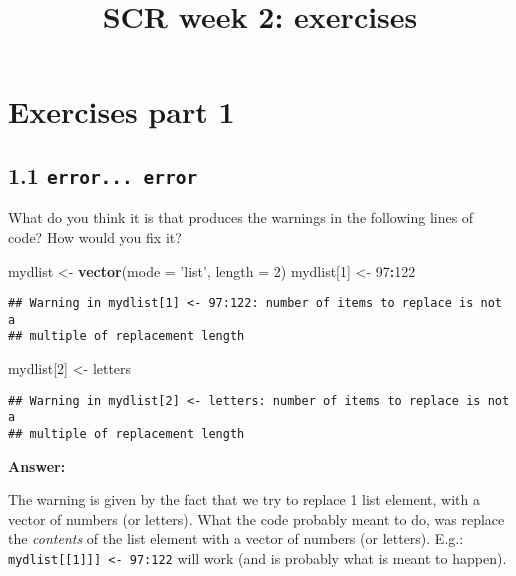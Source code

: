 \documentclass[]{article}
\title{SCR week 2: exercises}
\author{}
\date{}
\newenvironment{Shaded}{\begin{snugshade}}{\end{snugshade}}
\newcommand{\DataTypeTok}[1]{\textcolor[rgb]{0.13,0.29,0.53}{#1}}
\newcommand{\DecValTok}[1]{\textcolor[rgb]{0.00,0.00,0.81}{#1}}
\newcommand{\KeywordTok}[1]{\textcolor[rgb]{0.13,0.29,0.53}{\textbf{#1}}}
\newcommand{\NormalTok}[1]{#1}
\newcommand{\OperatorTok}[1]{\textcolor[rgb]{0.81,0.36,0.00}{\textbf{#1}}}
\newcommand{\StringTok}[1]{\textcolor[rgb]{0.31,0.60,0.02}{#1}}
\begin{document}
\maketitle

\hypertarget{exercises-part-1}{%
\section{Exercises part 1}\label{exercises-part-1}}

\hypertarget{error...-error}{%
\subsection{\texorpdfstring{1.1
\texttt{error...\ error}}{1.1 error... error}}\label{error...-error}}

What do you think it is that produces the warnings in the following
lines of code? How would you fix it?

\begin{Shaded}
\begin{Highlighting}[]
\NormalTok{mydlist <-}\StringTok{ }\KeywordTok{vector}\NormalTok{(}\DataTypeTok{mode =} \StringTok{'list'}\NormalTok{, }\DataTypeTok{length =} \DecValTok{2}\NormalTok{)}
\NormalTok{mydlist[}\DecValTok{1}\NormalTok{] <-}\StringTok{ }\DecValTok{97}\OperatorTok{:}\DecValTok{122}
\end{Highlighting}
\end{Shaded}

\begin{verbatim}
## Warning in mydlist[1] <- 97:122: number of items to replace is not a
## multiple of replacement length
\end{verbatim}

\begin{Shaded}
\begin{Highlighting}[]
\NormalTok{mydlist[}\DecValTok{2}\NormalTok{] <-}\StringTok{ }\NormalTok{letters}
\end{Highlighting}
\end{Shaded}

\begin{verbatim}
## Warning in mydlist[2] <- letters: number of items to replace is not a
## multiple of replacement length
\end{verbatim}

\textbf{Answer:}

The warning is given by the fact that we try to replace 1 list element,
with a vector of numbers (or letters). What the code probably meant to
do, was replace the \emph{contents} of the list element with a vector of
numbers (or letters). E.g.:
\texttt{mydlist{[}{[}1{]}{]}{]}\ \textless{}-\ 97:122} will work (and is
probably what is meant to happen).
\end{document}
